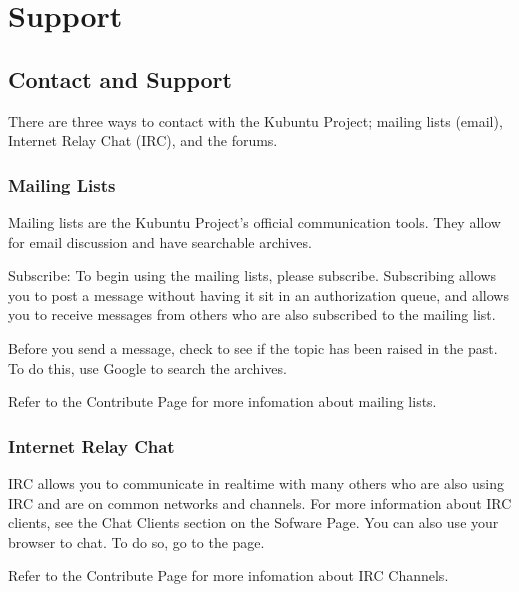\documentclass[letterpaper,10pt,english]{sphinxmanual}
\begin{document}
\chapter{Support}
\label{\detokenize{docs/support:support}}\label{\detokenize{docs/support:support-link}}\label{\detokenize{docs/support::doc}}

\section{Contact and Support}
\label{\detokenize{docs/support:contact-and-support}}
\sphinxAtStartPar
There are three ways to contact with the Kubuntu Project; mailing lists (email), Internet Relay Chat (IRC), and the forums.


\subsection{Mailing Lists}
\label{\detokenize{docs/support:mailing-lists}}
\sphinxAtStartPar
Mailing lists are the Kubuntu Project’s official communication tools. They allow for email discussion and have searchable archives.

\sphinxAtStartPar
Subscribe:
To begin using the mailing lists, please subscribe. Subscribing allows you to post a message without having it sit in an authorization queue, and allows you to receive messages from others who are also subscribed to the mailing list.

\sphinxAtStartPar
Before you send a message, check to see if the topic has been raised in the past. To do this, use Google to search the archives.

\sphinxAtStartPar
Refer to the Contribute Page for more infomation about mailing lists.


\subsection{Internet Relay Chat}
\label{\detokenize{docs/support:internet-relay-chat}}
\sphinxAtStartPar
IRC allows you to communicate in real\sphinxhyphen{}time with many others who are also using IRC and are on common networks and channels. For more information about IRC clients, see the Chat Clients section on the Sofware Page. You can also use your browser to chat. To do so, go to the  page.

\sphinxAtStartPar
Refer to the Contribute Page for more infomation about IRC Channels.
\end{document}
